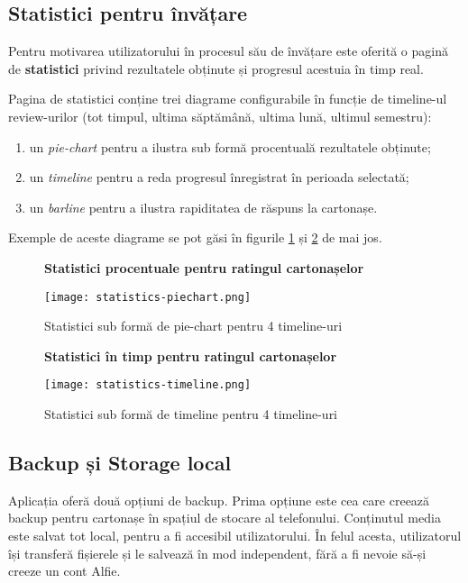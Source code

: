 \subsection{Statistici pentru învățare}

Pentru motivarea utilizatorului în procesul său de învățare este oferită o pagină de \textbf{statistici} privind rezultatele obținute și progresul acestuia în timp real.

Pagina de statistici conține trei diagrame configurabile în funcție de timeline-ul review-urilor (tot timpul, ultima săptămână, ultima lună, ultimul semestru):
\begin{enumerate}
    \item un \textit{pie-chart} pentru a ilustra sub formă procentuală rezultatele obținute;
    \item un \textit{timeline} pentru a reda progresul înregistrat în perioada selectată;
    \item un \textit{barline} pentru a ilustra rapiditatea de răspuns la cartonașe.
\end{enumerate}

Exemple de aceste diagrame se pot găsi în figurile \ref{fig:statistici_1} și \ref{fig:statistici_2} de mai jos.

\begin{figure}[H]
    \centering
    \textbf{Statistici procentuale pentru ratingul cartonașelor}\par\medskip
    \texttt{[image: statistics-piechart.png]}
    \caption{Statistici sub formă de pie-chart pentru 4 timeline-uri}
    \label{fig:statistici_1}
\end{figure}

\begin{figure}[H]
    \centering
    \textbf{Statistici în timp pentru ratingul cartonașelor}\par\medskip
    \texttt{[image: statistics-timeline.png]}
    \caption{Statistici sub formă de timeline pentru 4 timeline-uri}
    \label{fig:statistici_2}
\end{figure}

\subsection{Backup și Storage local}

Aplicația oferă două opțiuni de backup. Prima opțiune este cea care creează backup pentru cartonașe în spațiul de stocare al telefonului. Conținutul media este salvat tot local, pentru a fi accesibil utilizatorului. În felul acesta, utilizatorul își transferă fișierele și le salvează în mod independent, fără a fi nevoie să-și creeze un cont Alfie.

